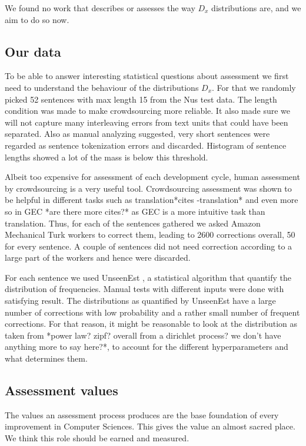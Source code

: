 \documentclass[english]{article}
\begin{document}
{We found no work that describes or assesses the way $D_x$ distributions are, and we aim to do so now. 

\subsection{Our data}
To be able to answer interesting statistical questions about assessment we first need to understand the behaviour of the distributions $D_x$. For that we randomly picked 52 sentences with max length 15 from the Nus \cite{dahlmeier2013building} test data. The length condition was made to make crowdsourcing more reliable. It also made sure we will not capture many interleaving errors from text units that could have been separated. Also as manual analyzing suggested, very short sentences were regarded as sentence tokenization errors and discarded. Histogram of sentence lengths showed a lot of the mass is below this threshold.

Albeit too expensive for assessment of each development cycle, human assessment by crowdsourcing is a very useful tool. Crowdsourcing assessment was shown to be helpful in different tasks such as translation{*}cites -translation{*} and even more so in GEC \cite{madnani2011they}{*}are there more cites?{*} as GEC is a more intuitive task than translation. Thus, for each of the sentences gathered we asked Amazon Mechanical Turk workers to correct them, leading to 2600 corrections overall, 50 for every sentence. A couple of sentences did not need correction according to a large part of the workers and hence were discarded.

For each sentence we used UnseenEst \cite{zou2015quantifying}, a statistical algorithm that quantify the distribution of frequencies. Manual tests with different inputs were done with satisfying result. The distributions as quantified by UnseenEst have a large number of corrections with low probability and a rather small number of frequent corrections. For that reason, it might be reasonable to look at the distribution as taken from {*}power law? zipf? overall from a dirichlet process? we don't have anything more to say here?{*}, to account for the different hyperparameters and what determines them.

\subsection{Assessment values\label{sec:Assessment-values}}

The values an assessment process produces are the base foundation of
 every improvement in Computer Sciences. This gives the value an
  almost sacred place. We think this role should be earned and measured.
 
}
\end{document}
